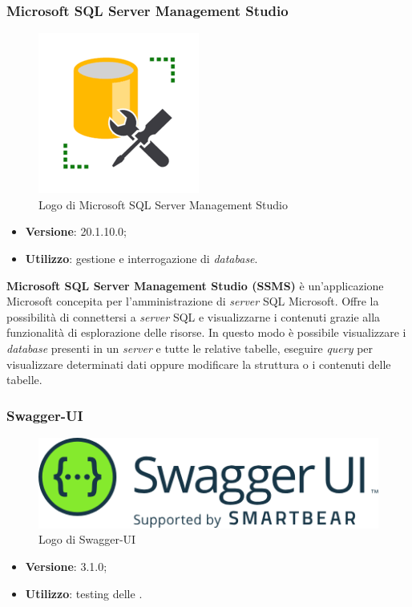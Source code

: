 \subsubsection{Microsoft SQL Server Management Studio}

\begin{figure}[H]
    \centering 
    \includegraphics[width=0.25\columnwidth]{images/loghi/sql_server.png} 
    \caption{Logo di Microsoft SQL Server Management Studio}
\end{figure}

\begin{itemize}
    \item \textbf{Versione}: 20.1.10.0;
    \item \textbf{Utilizzo}: gestione e interrogazione di \textit{database}.
\end{itemize}

\noindent \textbf{Microsoft SQL Server Management Studio (SSMS)} è un'applicazione Microsoft concepita per l'amministrazione di \textit{server} SQL Microsoft. Offre la possibilità di connettersi a \textit{server} SQL e visualizzarne i contenuti grazie alla funzionalità di esplorazione delle risorse. In questo modo è possibile visualizzare i \textit{database} presenti in un \textit{server} e tutte le relative tabelle, eseguire \textit{query} per visualizzare determinati dati oppure modificare la struttura o i contenuti delle tabelle.

\subsubsection{Swagger-UI}

\begin{figure}[H]
    \centering 
    \includegraphics[width=0.4\columnwidth]{images/loghi/swagger.png} 
    \caption{Logo di Swagger-UI}
\end{figure}

\begin{itemize}
    \item \textbf{Versione}: 3.1.0;
    \item \textbf{Utilizzo}: testing delle .
\end{itemize}

